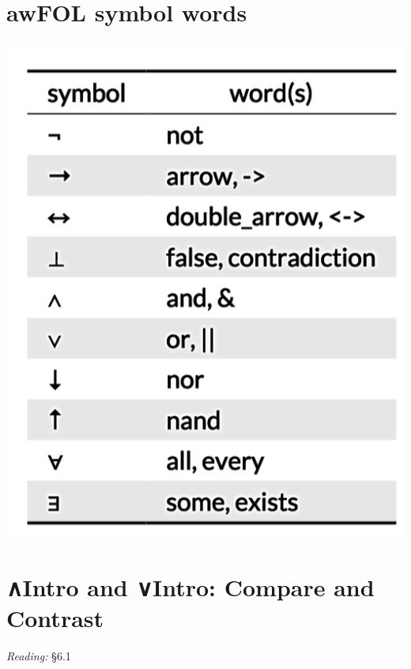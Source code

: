 \documentclass[12pt]{extarticle}
\begin{document}
\begin{multicols*}{3}
 

\section{awFOL symbol words}
\begin{center}
\includegraphics[scale=0.3]{img/awFOL_symbols.png}
\end{center}


\vfill
 
 
\section{∧Intro and ∨Intro: Compare and Contrast}
 
\emph{Reading:} §6.1
 

\end{multicols*}
\end{document}
